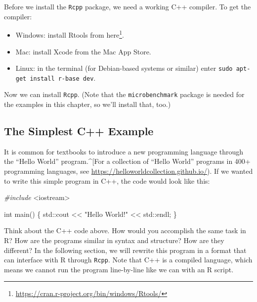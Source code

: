 \documentclass[
]{krantz}
\newenvironment{Shaded}{\begin{snugshade}}{\end{snugshade}}
\newcommand{\BuiltInTok}[1]{#1}
\newcommand{\DataTypeTok}[1]{\textcolor[rgb]{0.13,0.29,0.53}{#1}}
\newcommand{\ImportTok}[1]{#1}
\newcommand{\NormalTok}[1]{#1}
\newcommand{\PreprocessorTok}[1]{\textcolor[rgb]{0.56,0.35,0.01}{\textit{#1}}}
\newcommand{\StringTok}[1]{\textcolor[rgb]{0.31,0.60,0.02}{#1}}
\providecommand{\tightlist}{%
  \setlength{\itemsep}{0pt}\setlength{\parskip}{0pt}}
\renewcommand{\href}[2]{#2\footnote{\url{#1}}}
\begin{document}
Before we install the \texttt{Rcpp} package, we need a working C++ compiler. To get the compiler:

\begin{itemize}
\tightlist
\item
  Windows: install Rtools from \href{https://cran.r-project.org/bin/windows/Rtools/}{here}.
\item
  Mac: install Xcode from the Mac App Store.
\item
  Linux: in the terminal (for Debian-based systems or similar) enter
  \texttt{sudo\ apt-get\ install\ r-base\ dev}.
\end{itemize}

Now we can install \texttt{Rcpp}. (Note that the \texttt{microbenchmark} package is needed for the examples in this chapter, so we'll install that, too.)

\hypertarget{the-simplest-c-example}{%
\subsection{The Simplest C++ Example}\label{the-simplest-c-example}}

It is common for textbooks to introduce a new programming language through the ``Hello World'' program.\^{}{[}For a collection of ``Hello World'' programs in 400+ programming languages, see \url{https://helloworldcollection.github.io/}). If we wanted to write this simple program in C++, the code would look like this:

\begin{Shaded}
\begin{Highlighting}[]
\PreprocessorTok{\#include }\ImportTok{\textless{}iostream\textgreater{}}

\DataTypeTok{int}\NormalTok{ main()}
\NormalTok{\{}
    \BuiltInTok{std::}\NormalTok{cout \textless{}\textless{} }\StringTok{"Hello World!"}\NormalTok{ \textless{}\textless{} }\BuiltInTok{std::}\NormalTok{endl;}
\NormalTok{\}}
\end{Highlighting}
\end{Shaded}

Think about the C++ code above. How would you accomplish the same task in R? How are the programs similar in syntax and structure? How are they different? In the following section, we will rewrite this program in a format that can interface with R through \texttt{Rcpp}. Note that C++ is a compiled language, which means we cannot run the program line-by-line like we can with an R script.
\end{document}
